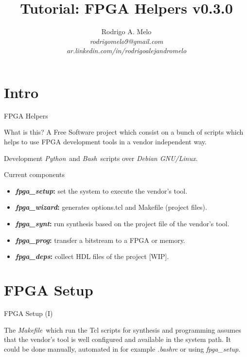 \documentclass{beamer}
\title[FPGA Helpers]{Tutorial: FPGA Helpers v0.3.0}
\author{
  Rodrigo A. Melo\\
  \textit{rodrigomelo9@gmail.com}\\
  \textit{ar.linkedin.com/in/rodrigoalejandromelo}
}
\newcommand{\python}         {\textit{Python}}
\newcommand{\bash}           {\textit{Bash}}
\newcommand{\debian}         {\textit{Debian GNU/Linux}}
\newcommand{\fpgasetup}      {\textit{fpga\_setup}}
\newcommand{\fpgawizard}     {\textit{fpga\_wizard}}
\newcommand{\fpgasynt}       {\textit{fpga\_synt}}
\newcommand{\fpgaprog}       {\textit{fpga\_prog}}
\newcommand{\fpgadeps}       {\textit{fpga\_deps}}
\newcommand{\makefile}       {\textit{Makefile}}
\begin{document}
\begin{frame}
  \titlepage
\end{frame}

\section{Intro}

\begin{frame}{FPGA Helpers}
  \begin{exampleblock}{What is this?}
    A Free Software project which consist on a bunch of scripts which helps to use FPGA development
    tools in a vendor independent way.
  \end{exampleblock}
  \begin{block}{Development}
    \python\ and \bash\ scripts over \debian.
  \end{block}
\end{frame}

\begin{frame}{Current components}
  \begin{itemize}
    \item \textbf{\fpgasetup:} set the system to execute the vendor's tool.
    \item \textbf{\fpgawizard:} generates options.tcl and Makefile (project files).
    \item \textbf{\fpgasynt:} run synthesis based on the project file of the vendor's tool.
    \item \textbf{\fpgaprog:} transfer a bitstream to a FPGA or memory.
    \item \textbf{\fpgadeps:} collect HDL files of the project [WIP].
  \end{itemize}
\end{frame}


\section{FPGA Setup}

\begin{frame}[fragile]{FPGA Setup (I)}
  \begin{block}{}
    The \makefile\ which run the Tcl scripts for synthesis and programming assumes that the
    vendor's tool is well configured and available in the system path.
    It could be done manually, automated in for example \textit{.bashrc} or using \fpgasetup.
  \end{block}{}
  \scriptsize
  
\end{frame}
\end{document}
